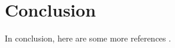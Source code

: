 \section{Conclusion}
 
In conclusion, here are some more references \cite{Pincus2016,Hardy2016,Einstein1906,Turok1996}. 
 
\lipsum[53-55] %

